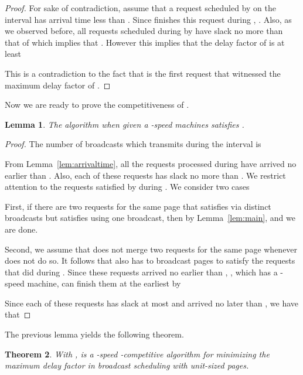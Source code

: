 \documentclass[11pt]{article}
\newtheorem{lemma}{Lemma}[section]
\newtheorem{theorem}[lemma]{Theorem}
\newcommand{\lemlab}[1]{\label{lemma:#1}}
\begin{document}
\begin{proof}
  For sake of contradiction, assume that a request 
  scheduled by  on the interval  has arrival time less than
  . Since  finishes
  this request during , .
  Also, as we observed before, all requests scheduled during  by
   have slack no more than that of  which implies
  that . However this implies that
  the delay factor of  is at least
    

      This is a contradiction to the fact that  is the
      first request that witnessed the maximum delay factor of \sbg.
\end{proof}

\medskip

Now we are ready to prove the competitiveness of .

\begin{lemma}
  \lemlab{eps-ceps-c-competitive} The algorithm  when given a
  -speed machines satisfies .
\end{lemma}

\begin{proof}
The number of broadcasts which  transmits during the
interval  is


From Lemma~\ref{lem:arrivaltime}, all the requests processed during
 have arrived no earlier than . Also, each of these requests has slack no more than
. We restrict attention to the requests satisfied by 
during . We consider two cases

First, if there are two requests for the same page that  satisfies
via distinct broadcasts but  satisfies using one broadcast, then
by Lemma~\ref{lem:main},  and we
are done.

Second, we assume that  does not merge two requests for the same
page whenever  does not do so. It follows that  also has
to broadcast  pages to satisfy
the requests that  did during . Since these
requests arrived no earlier than ,
, which has a -speed machine, can finish them at the earliest
by


Since each of these requests has slack at most  and arrived
no later than , we have that

\end{proof}

The previous lemma yields the following theorem.

\begin{theorem}
  With ,  is a -speed -competitive algorithm for minimizing the maximum delay
  factor in broadcast scheduling with unit-sized pages.
\end{theorem}
\end{document}
